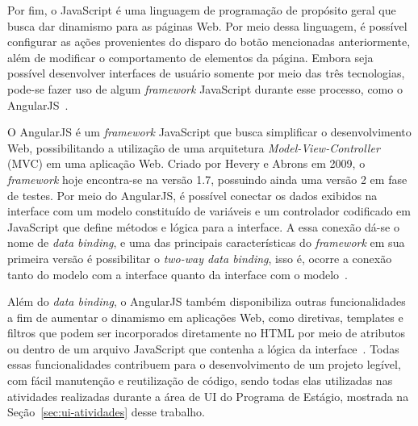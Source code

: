 Por fim, o JavaScript é uma linguagem de programação de propósito geral que busca dar dinamismo para as páginas Web. Por meio dessa linguagem, é possível configurar as ações provenientes do disparo do botão mencionadas anteriormente, além de modificar o comportamento de elementos da página. Embora seja possível desenvolver interfaces de usuário somente por meio das três tecnologias, pode-se fazer uso de algum \textit{framework} JavaScript durante esse processo, como o AngularJS~\cite{angularjs-2017, oppermann-2002}.

O AngularJS é um \textit{framework} JavaScript que busca simplificar o desenvolvimento Web, possibilitando a utilização de uma arquitetura \textit{Model-View-Controller} (MVC) em uma aplicação Web. Criado por Hevery e Abrons em 2009, o \textit{framework} hoje encontra-se na versão 1.7, possuindo ainda uma versão 2 em fase de testes. Por meio do AngularJS, é possível conectar os dados exibidos na interface com um modelo constituído de variáveis e um controlador codificado em JavaScript que define métodos e lógica para a interface. A essa conexão dá-se o nome de \textit{data binding}, e uma das principais características do \textit{framework} em sua primeira versão é possibilitar o \textit{two-way data binding}, isso é, ocorre a conexão tanto do modelo com a interface quanto da interface com o modelo~\cite{angularjs-2017}.

Além do \textit{data binding}, o AngularJS também disponibiliza outras funcionalidades a fim de aumentar o dinamismo em aplicações Web, como diretivas, templates e filtros que podem ser incorporados diretamente no HTML por meio de atributos ou dentro de um arquivo JavaScript que contenha a lógica da interface~\cite{angularjs-2017}. Todas essas funcionalidades contribuem para o desenvolvimento de um projeto legível, com fácil manutenção e reutilização de código, sendo todas elas utilizadas nas atividades realizadas durante a área de UI do Programa de Estágio, mostrada na Seção~\ref{sec:ui-atividades} desse trabalho.